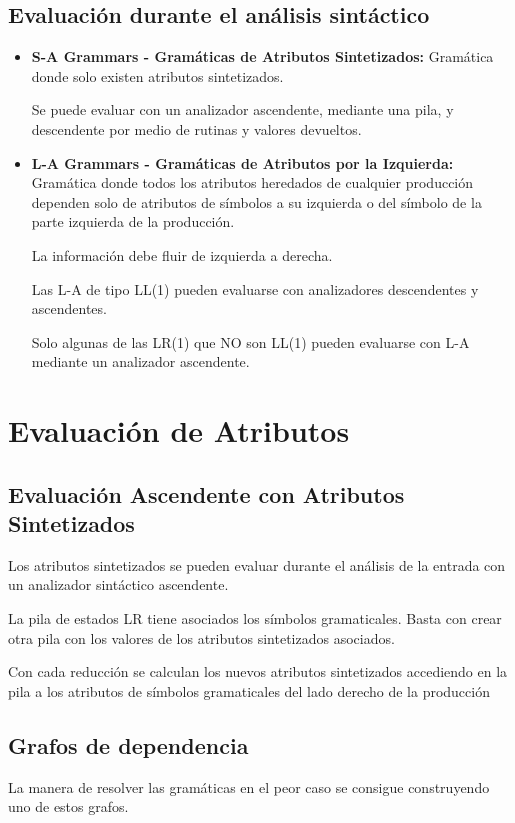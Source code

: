 \documentclass[12pt, twoside, openright]{report} %
\begin{document}
\subsection{Evaluación durante el análisis sintáctico}
\begin{itemize}
	\item \textbf{S-A Grammars - Gramáticas de Atributos Sintetizados:} Gramática donde solo existen atributos sintetizados.

	      Se puede evaluar con un analizador ascendente, mediante una pila, y descendente por medio de rutinas y valores devueltos.
	\item \textbf{L-A Grammars - Gramáticas de Atributos por la Izquierda:} Gramática donde todos los atributos heredados de cualquier producción dependen solo de atributos de símbolos a su izquierda o del símbolo de la parte izquierda de la producción.

	      La información debe fluir de izquierda a derecha.

	      Las L-A de tipo LL(1) pueden evaluarse con analizadores descendentes y ascendentes.

	      Solo algunas de las LR(1) que NO son LL(1) pueden evaluarse con L-A mediante un analizador ascendente.
\end{itemize}
\pagebreak
\section{Evaluación de Atributos}
\subsection{Evaluación Ascendente con Atributos Sintetizados}
Los atributos sintetizados se pueden evaluar durante el análisis de la entrada con un analizador sintáctico ascendente.

La pila de estados LR tiene asociados los símbolos gramaticales.
Basta con crear otra pila con los valores de los atributos sintetizados asociados.

Con cada reducción se calculan los nuevos atributos sintetizados accediendo en la pila a los atributos de símbolos gramaticales del lado derecho de la producción

\subsection{Grafos de dependencia}
La manera de resolver las gramáticas en el peor caso se consigue construyendo uno de estos grafos.
\end{document}
